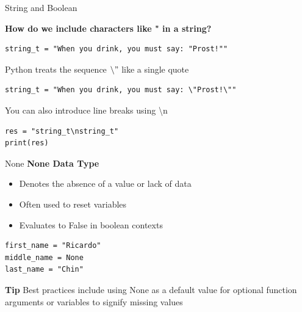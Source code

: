 \documentclass[
	11pt, 
]{beamer}
\begin{document}

\begin{frame}[fragile]{String and Boolean}

\textbf{How do we include characters like " in a string?}

\begin{verbatim}
string_t = "When you drink, you must say: "Prost!""
\end{verbatim}

Python treats the sequence $\backslash"$ like a single quote

\begin{verbatim}
string_t = "When you drink, you must say: \"Prost!\""
\end{verbatim}

You can also introduce line breaks using \backslash n 

\begin{verbatim}
res = "string_t\nstring_t"
print(res)
\end{verbatim}
\end{frame}


\begin{frame}[fragile]{None}
\textbf{None Data Type}
    \begin{itemize}
        \item Denotes the absence of a value or lack of data
        \item Often used to reset variables
        \item Evaluates to False in boolean contexts
    \end{itemize}

\begin{verbatim}
first_name = "Ricardo"
middle_name = None
last_name = "Chin"
\end{verbatim}
\begin{exampleblock}{\textbf{Tip}}
    Best practices include using None as a default value for optional function arguments or variables to signify missing values
\end{exampleblock}

\end{frame}

\end{document}
